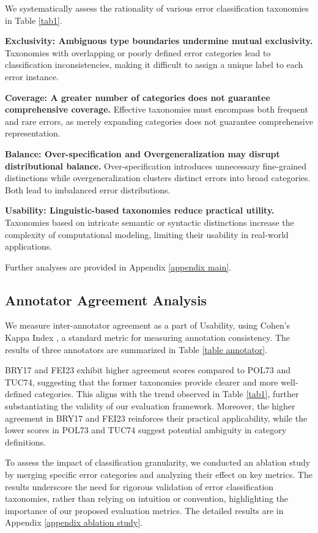 We systematically assess the rationality of various error classification taxonomies in Table \ref{tab1}.

\textbf{Exclusivity: Ambiguous type boundaries undermine mutual exclusivity.} Taxonomies with overlapping or poorly defined error categories lead to classification inconsistencies, making it difficult to assign a unique label to each error instance.

\textbf{Coverage: A greater number of categories does not guarantee comprehensive coverage.} Effective taxonomies must encompass both frequent and rare errors, as merely expanding categories does not guarantee comprehensive representation.

\textbf{Balance: Over-specification and Overgeneralization may disrupt distributional balance.} Over-specification introduces unnecessary fine-grained distinctions while overgeneralization clusters distinct errors into broad categories. Both lead to imbalanced error distributions.

\textbf{Usability: Linguistic-based taxonomies reduce practical utility.} Taxonomies based on intricate semantic or syntactic distinctions increase the complexity of computational modeling, limiting their usability in real-world applications.

Further analyses are provided in Appendix \ref{appendix main}.

\subsection{Annotator Agreement Analysis}
\label{section annotator agreement}
We measure inter-annotator agreement as a part of Usability, using Cohen’s Kappa Index \citep{cohen}, a standard metric for measuring annotation consistency. The results of three annotators are summarized in Table \ref{table annotator}.

BRY17 and FEI23 exhibit higher agreement scores compared to POL73 and TUC74, suggesting that the former taxonomies provide clearer and more well-defined categories. This aligns with the trend observed in Table \ref{tab1}, further substantiating the validity of our evaluation framework. Moreover, the higher agreement in BRY17 and FEI23 reinforces their practical applicability, while the lower scores in POL73 and TUC74 suggest potential ambiguity in category definitions.

To assess the impact of classification granularity, we conducted an ablation study by merging specific error categories and analyzing their effect on key metrics. The results underscore the need for rigorous validation of error classification taxonomies, rather than relying on intuition or convention, highlighting the importance of our proposed evaluation metrics. The detailed results are in Appendix \ref{appendix ablation study}.

